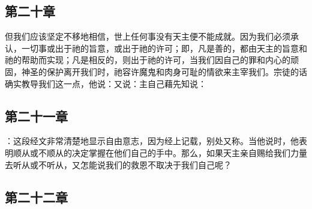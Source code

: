 
\subsection{第二十章}

\par

但我们应该坚定不移地相信，世上任何事没有天主便不能成就。因为我们必须承认，一切事或出于祂的旨意，或出于祂的许可；即，凡是善的，都由天主的旨意和祂的帮助而实现；凡是相反的，则出于祂的许可，当我们因自己的罪和内心的顽固，神圣的保护离开我们时，祂容许魔鬼和肉身可耻的情欲来主宰我们。宗徒的话确实教导我们这一点，他说：又说：主自己藉先知说：\par


\subsection{第二十一章}

\par

：这段经文非常清楚地显示自由意志，因为经上记载，别处又称。当他说时，他表明顺从或不顺从的决定掌握在他们自己的手中。那么，如果天主亲自赐给我们力量去听从或不听从，又怎能说我们的救恩不取决于我们自己呢？\par


\subsection{第二十二章}

\par

